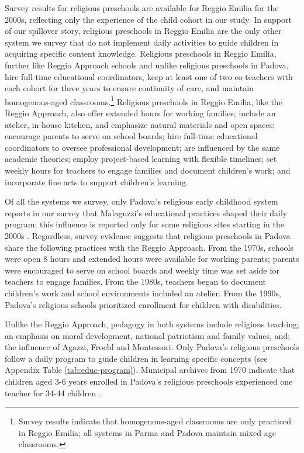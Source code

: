 Survey results for religious preschools are available for Reggio Emilia for the 2000s, reflecting only the experience of the child cohort in our study. In support of our spillover story, religious preschools in Reggio Emilia are the only other system we survey that do not implement daily activities to guide children in acquiring specific content knowledge. Religious preschools in Reggio Emilia, further like Reggio Approach schools and unlike religious preschools in Padova, hire full-time educational coordinators, keep at least one of two co-teachers with each cohort for three years to ensure continuity of care, and maintain homogenous-aged classrooms.\footnote{Survey results indicate that homogenous-aged classrooms are only practiced in Reggio Emilia; all systems in Parma and Padova maintain mixed-age classrooms.} Religious preschools in Reggio Emilia, like the Reggio Approach, also offer extended hours for working families; include an atelier, in-house kitchen, and emphasize natural materials and open spaces; encourage parents to serve on school boards; hire full-time educational coordinators to oversee professional development; are influenced by the same academic theories; employ project-based learning with flexible timelines; set weekly hours for teachers to engage families and document children's work; and incorporate fine arts to support children's learning.

Of all the systems we survey, only Padova's religious early childhood system reports in our survey that Malaguzzi's educational practices shaped their daily program; this influence is reported only for some religious sites starting in the 2000s  \citep{CEHD_2016_Historical-Analysis}. Regardless, survey evidence suggests that religious preschools in Padova share the following practices with the Reggio Approach. From the 1970s, schools were open 8 hours and extended hours were available for working parents; parents were encouraged to serve on school boards and weekly time was set aside for teachers to engage families. From the 1980s, teachers began to document children's work and school environments included an atelier. From the 1990s, Padova's religious schools prioritized enrollment for children with disabilities.

Unlike the Reggio Approach, pedagogy in both systems include religious teaching; an emphasis on moral development, national patriotism and family values, and; the influence of Agazzi, Froebl and Montessori. Only Padova's religious preschools follow a daily program to guide children in learning specific concepts (see Appendix Table \ref{tab:educ-program}). Municipal archives from 1970 indicate that children aged 3-6 years enrolled in Padova's religious preschools experienced one teacher for 34-44 children \citep{Padova-Admin-Data_1964-2011}.

